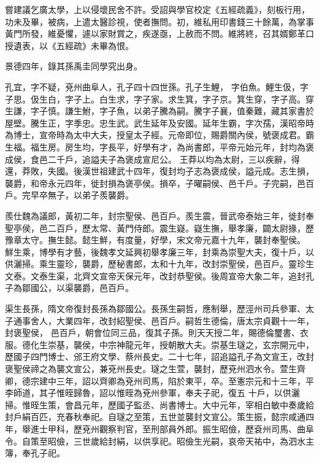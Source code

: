 \begin{pinyinscope}
 嘗建議乞廣太學，上以侵壞民舍不許。受詔與學官校定《五經疏義》，刻板行用，功未及畢，被病，上遣太醫診視，使者撫問。初，維私用印書錢三十餘萬，為掌事黃門所發，維憂懼，遽以家財賞之，疾遂亟，上赦而不問。維將終，召其婿鄭革口授遺表，以《五經疏》未畢為恨。



 景德四年，錄其孫禹圭同學究出身。



 孔宜，字不疑，兗州曲阜人，孔子四十四世孫。孔子生鯉，
 字伯魚。鯉生伋，字子思。伋生白，字子上。白生求，字子家。求生箕，字子京。箕生穿，字子高。穿生謙，字子慎。謙生鮒，字子魚，以弟子騰為嗣。騰字子襄，值秦難，藏其家書於屋壁。騰生正，字季忠。忠生武。武生延年及安國。延年生霸，字次孺，漢昭帝時為博士，宣帝時為太中大夫，授皇太子經。元帝即位，賜爵關內侯，號褒成君。霸生福。福生房。房生均，字長平，好學有才，為尚書郎，平帝元始元年，封均為褒成侯，食邑二千戶，追謚夫子為褒成宣尼公。
 王莽以均為太尉，三以疾辭，得還，莽敗，失國。後漢世祖建武十四年，復封均子志為褒成侯，謚元成。志生損，襲爵，和帝永元四年，徙封損為褒亭侯。損卒，子曜嗣侯、邑千戶。子完嗣，邑百戶。完早卒無子，以弟子羨襲爵。



 羨仕魏為議郎，黃初二年，封宗聖侯、邑百戶。羨生震，晉武帝泰始三年，徙封奉聖亭侯，邑二百戶，歷太常、黃門侍郎。震生嶷。嶷生撫，舉孝廉，闢太尉掾，歷豫章太守。撫生懿。懿生鮮，有度量，好學，宋文帝元嘉十九年，襲封奉聖侯。
 鮮生乘，博學有才藝，後魏孝文延興初舉孝廉三年，封乘為崇聖大夫，復十戶，以供灑掃。乘生靈珍，襲爵，歷秘書郎，太和十九年，改封崇聖侯，邑百戶。靈珍生文泰。文泰生渠，北齊文宣帝天保元年，改封恭聖侯。後周宣帝大象二年，追封孔子為鄒國公，以渠襲爵，邑百戶。



 渠生長孫，隋文帝復封長孫為鄒國公。長孫生嗣哲，應制舉，歷涇州司兵參軍、太子通事舍人，大業四年，改封紹聖侯、邑百戶。嗣哲生德倫，唐太宗貞觀十一年，封褒聖侯，
 邑百戶，朝會位同三品，復其子孫。則天天授二年，賜德倫璽書、衣服。德化生崇基，襲侯，中宗神龍元年，授朝散大夫。崇基生璲之，玄宗開元中，歷國子四門博士、邠王府文學、蔡州長史。二十七年，詔追謚孔子為文宣王，改封褒聖侯禘之為襲文宣公，兼兗州長史。璲之生萱，襲封，歷兗州泗水令。萱生齊卿，德宗建中三年，詔以齊卿為兗州司馬，陷於東平，卒。至憲宗元和十三年，平李師道，其子惟晊歸魯，詔以惟晊為兗州參軍，奉夫子祀，復五
 十戶，以供灑掃。惟晊生策，會昌元年，歷國子監丞、尚書博士。大中元年，宰相白敏中奏歲給封戶絹百匹，充春秋奉祀。自璲之至策，五世並襲封文宣公。策生振，懿宗咸通四年，舉進士甲科，歷兗州觀察判官，至刑部員外郎。振生昭儉，歷袞州司馬、曲阜令。自策至昭儉，三世歲給封絹，以供享祀。昭儉生光嗣，哀帝天祐中，為泗水主簿，奉孔子祀。




\end{pinyinscope}
